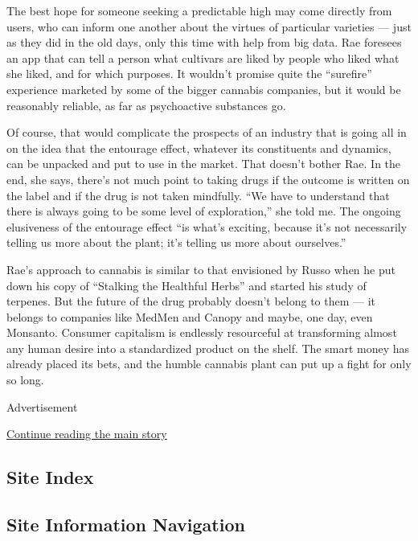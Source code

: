 The best hope for someone seeking a predictable high may come directly
from users, who can inform one another about the virtues of particular
varieties --- just as they did in the old days, only this time with help
from big data. Rae foresees an app that can tell a person what cultivars
are liked by people who liked what she liked, and for which purposes. It
wouldn't promise quite the ``surefire'' experience marketed by some of
the bigger cannabis companies, but it would be reasonably reliable, as
far as psychoactive substances go.

Of course, that would complicate the prospects of an industry that is
going all in on the idea that the entourage effect, whatever its
constituents and dynamics, can be unpacked and put to use in the market.
That doesn't bother Rae. In the end, she says, there's not much point to
taking drugs if the outcome is written on the label and if the drug is
not taken mindfully. ``We have to understand that there is always going
to be some level of exploration,'' she told me. The ongoing elusiveness
of the entourage effect ``is what's exciting, because it's not
necessarily telling us more about the plant; it's telling us more about
ourselves.''

Rae's approach to cannabis is similar to that envisioned by Russo when
he put down his copy of ``Stalking the Healthful Herbs'' and started his
study of terpenes. But the future of the drug probably doesn't belong to
them --- it belongs to companies like MedMen and Canopy and maybe, one
day, even Monsanto. Consumer capitalism is endlessly resourceful at
transforming almost any human desire into a standardized product on the
shelf. The smart money has already placed its bets, and the humble
cannabis plant can put up a fight for only so long.

Advertisement

\protect\hyperlink{after-bottom}{Continue reading the main story}

\hypertarget{site-index}{%
\subsection{Site Index}\label{site-index}}

\hypertarget{site-information-navigation}{%
\subsection{Site Information
Navigation}\label{site-information-navigation}}

